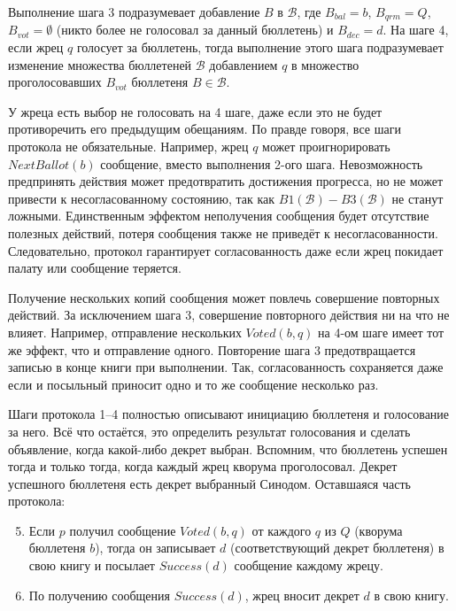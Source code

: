 \documentclass[12pt, a4paper]{article} %
\begin{document}
Выполнение шага 3 подразумевает добавление $B$ в $\mathcal{B}$, где $B_{bal} = b$, $B_{qrm} = Q$, $B_{vot} = \emptyset$ (никто более не голосовал за данный бюллетень) и $B_{dec} = d$. На шаге 4, если жрец $q$ голосует за бюллетень, тогда выполнение этого шага подразумевает изменение множества бюллетеней $\mathcal{B}$ добавлением $q$ в множество проголосовавших $B_{vot}$ бюллетеня $B \in \mathcal{B}$.


У жреца есть выбор не голосовать на 4 шаге, даже если это не будет противоречить его предыдущим обещаниям. По правде говоря, все шаги протокола не обязательные. Например, жрец $q$ может проигнорировать $NextBallot(b)$ сообщение, вместо выполнения 2-ого шага. Невозможность предпринять действия может предотвратить достижения прогресса, но не может привести к несогласованному состоянию, так как $B1(\mathcal{B}) - B3(\mathcal{B})$ не станут ложными. Единственным эффектом неполучения сообщения будет отсутствие полезных действий, потеря сообщения также не приведёт к несогласованности. Следовательно, протокол гарантирует согласованность даже если жрец покидает палату или сообщение теряется.

Получение нескольких копий сообщения может повлечь совершение повторных действий. За исключением шага 3, совершение повторного действия ни на что не влияет. Например, отправление нескольких $Voted(b, q)$ на 4-ом шаге имеет тот же эффект, что и отправление одного. Повторение шага 3 предотвращается записью в конце книги при выполнении. Так, согласованность сохраняется даже если и посыльный приносит одно и то же сообщение несколько раз.

Шаги протокола 1--4 полностью описывают инициацию бюллетеня и голосование за него. Всё что остаётся, это определить результат голосования и сделать объявление, когда какой-либо декрет выбран. Вспомним, что бюллетень успешен тогда и только тогда, когда каждый жрец кворума проголосовал. Декрет успешного бюллетеня есть декрет выбранный Синодом. Оставшаяся часть протокола:
\begin{enumerate} \setcounter{enumi}{4}
    \item Если $p$ получил сообщение $Voted(b, q)$ от каждого $q$ из $Q$ (кворума бюллетеня $b$), тогда он записывает $d$ (соответствующий декрет бюллетеня) в свою книгу и посылает $Success(d)$ сообщение каждому жрецу.

    \item По получению сообщения $Success(d)$, жрец вносит декрет $d$ в свою книгу.
\end{enumerate}
\end{document}
